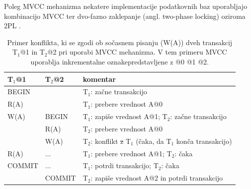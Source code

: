 \documentclass[a4paper, 12pt]{book}
\providecommand{\DIFaddtex}[1]{{\protect\color{blue}\uwave{#1}}} %
\providecommand{\DIFdeltex}[1]{{\protect\color{red}\sout{#1}}}                      %
\providecommand{\DIFaddFL}[1]{\DIFadd{#1}} %
\providecommand{\DIFdelFL}[1]{\DIFdel{#1}} %
\providecommand{\DIFaddbeginFL}{} %
\providecommand{\DIFaddendFL}{} %
\providecommand{\DIFdelbeginFL}{} %
\providecommand{\DIFdelendFL}{} %
\providecommand{\DIFadd}[1]{\texorpdfstring{\DIFaddtex{#1}}{#1}} %
\providecommand{\DIFdel}[1]{\texorpdfstring{\DIFdeltex{#1}}{}} %
\newcommand{\DIFscaledelfig}{0.5}
\newlength{\DIFdelgraphicswidth} %
\newlength{\DIFdelgraphicsheight} %
\newcommand{\DIFaddincludegraphics}[2][]{{\color{blue}\fbox{\DIFOincludegraphics[#1]{#2}}}} %
\newcommand{\DIFdelincludegraphics}[2][]{%
\sbox{\DIFdelgraphicsbox}{\DIFOincludegraphics[#1]{#2}}%
\settoboxwidth{\DIFdelgraphicswidth}{\DIFdelgraphicsbox} %
\settoboxtotalheight{\DIFdelgraphicsheight}{\DIFdelgraphicsbox} %
\scalebox{\DIFscaledelfig}{%
\parbox[b]{\DIFdelgraphicswidth}{\usebox{\DIFdelgraphicsbox}\\[-\baselineskip] \rule{\DIFdelgraphicswidth}{0em}}\llap{\resizebox{\DIFdelgraphicswidth}{\DIFdelgraphicsheight}{%
\setlength{\unitlength}{\DIFdelgraphicswidth}%
\begin{picture}(1,1)%
\thicklines\linethickness{2pt} %
{\color[rgb]{1,0,0}\put(0,0){\framebox(1,1){}}}%
{\color[rgb]{1,0,0}\put(0,0){\line( 1,1){1}}}%
{\color[rgb]{1,0,0}\put(0,1){\line(1,-1){1}}}%
\end{picture}%
}\hspace*{3pt}}} %
} %
\DeclareRobustCommand{\DIFaddbeginFL}{\DIFOaddbeginFL \let\includegraphics\DIFaddincludegraphics} %
\DeclareRobustCommand{\DIFaddendFL}{\DIFOaddendFL \let\includegraphics\DIFOincludegraphics} %
\DeclareRobustCommand{\DIFdelbeginFL}{\DIFOdelbeginFL \let\includegraphics\DIFdelincludegraphics} %
\DeclareRobustCommand{\DIFdelendFL}{\DIFOaddendFL \let\includegraphics\DIFOincludegraphics} %
\begin{document}
Poleg MVCC mehanizma nekatere implementacije podatkovnih baz uporabljajo kombinacijo MVCC ter dvo-fazno zaklepanje (angl. two-phase locking) oziroma 2PL \cite{Pavlo2016Sep, MainMemoryDatabaseSystems}.

\newpage

\begin{table}[H]
\begin{center}
\begin{tabular}{p{}|p{}|p{}} 
    \textbf{T$_{\text{1}}$@1} & \textbf{T$_{\text{2}}$@2} & \textbf{komentar} \\
\hline
BEGIN  &        & T$_{\text{1}}$: začne transakcijo \\
R(A)   &        & T$_{\text{1}}$: prebere vrednost A@0 \\
W(A)   & BEGIN  & T$_{\text{1}}$: zapiše vrednost A@1; T$_{\text{2}}$: začne transakcijo \\
        & R(A)   & T$_{\text{2}}$: prebere vrednost A@0  \\
        & W(A)   & T$_{\text{2}}$: konflikt \DIFdelbeginFL \DIFdelFL{z }\DIFdelendFL \DIFaddbeginFL \DIFaddFL{s }\DIFaddendFL T$_{\text{1}}$ (čaka, da T$_{\text{1}}$ konča transakcijo) \\
R(A)   & ...    & T$_{\text{1}}$: prebere vrednost A@1; T$_{\text{2}}$: čaka \\
COMMIT & ...    & T$_{\text{1}}$: potrdi transakcijo; T$_{\text{2}}$: čaka \\
        & COMMIT & T$_{\text{2}}$: zapiše vrednost A@2 in potrdi transakcijo \\
\end{tabular}
\end{center}
\caption{Primer \cite{lecture-mvcc} konflikta, ki se zgodi ob sočasnem pisanju (W(A)) dveh transakcij T$_{\text{1}}$@1 in T$_{\text{2}}$@2 pri uporabi MVCC mehanizma. V tem primeru MVCC uporablja inkrementalne oznake\DIFaddbeginFL \DIFaddFL{, }\DIFaddendFL predstavljene z @0 @1 @2.}
\label{tbl_cc_mvcc_example}
\end{table}
\end{document}
